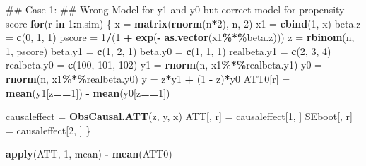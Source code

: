 \documentclass[]{article}
\newenvironment{Shaded}{\begin{snugshade}}{\end{snugshade}}
\newcommand{\KeywordTok}[1]{\textcolor[rgb]{0.13,0.29,0.53}{\textbf{#1}}}
\newcommand{\DecValTok}[1]{\textcolor[rgb]{0.00,0.00,0.81}{#1}}
\newcommand{\StringTok}[1]{\textcolor[rgb]{0.31,0.60,0.02}{#1}}
\newcommand{\ControlFlowTok}[1]{\textcolor[rgb]{0.13,0.29,0.53}{\textbf{#1}}}
\newcommand{\OperatorTok}[1]{\textcolor[rgb]{0.81,0.36,0.00}{\textbf{#1}}}
\newcommand{\NormalTok}[1]{#1}
\begin{document}
\begin{Shaded}
\begin{Highlighting}[]
\NormalTok{## Case 1:}
\NormalTok{## Wrong Model for y1 and y0 but correct model for propensity score}
\ControlFlowTok{for}\NormalTok{(r }\ControlFlowTok{in} \DecValTok{1}\OperatorTok{:}\NormalTok{n.sim)}
\NormalTok{\{}
\NormalTok{  x       =}\StringTok{ }\KeywordTok{matrix}\NormalTok{(}\KeywordTok{rnorm}\NormalTok{(n}\OperatorTok{*}\DecValTok{2}\NormalTok{), n, }\DecValTok{2}\NormalTok{)}
\NormalTok{  x1      =}\StringTok{ }\KeywordTok{cbind}\NormalTok{(}\DecValTok{1}\NormalTok{, x)}
\NormalTok{  beta.z  =}\StringTok{ }\KeywordTok{c}\NormalTok{(}\DecValTok{0}\NormalTok{, }\DecValTok{1}\NormalTok{, }\DecValTok{1}\NormalTok{)}
\NormalTok{  pscore  =}\StringTok{ }\DecValTok{1}\OperatorTok{/}\NormalTok{(}\DecValTok{1} \OperatorTok{+}\StringTok{ }\KeywordTok{exp}\NormalTok{(}\OperatorTok{-}\StringTok{ }\KeywordTok{as.vector}\NormalTok{(x1}\OperatorTok{\%*\%}\NormalTok{beta.z)))}
\NormalTok{  z       =}\StringTok{ }\KeywordTok{rbinom}\NormalTok{(n, }\DecValTok{1}\NormalTok{, pscore)}
\NormalTok{  beta.y1 =}\StringTok{ }\KeywordTok{c}\NormalTok{(}\DecValTok{1}\NormalTok{, }\DecValTok{2}\NormalTok{, }\DecValTok{1}\NormalTok{)}
\NormalTok{  beta.y0 =}\StringTok{ }\KeywordTok{c}\NormalTok{(}\DecValTok{1}\NormalTok{, }\DecValTok{1}\NormalTok{, }\DecValTok{1}\NormalTok{)}
\NormalTok{  realbeta.y1 =}\StringTok{ }\KeywordTok{c}\NormalTok{(}\DecValTok{2}\NormalTok{, }\DecValTok{3}\NormalTok{, }\DecValTok{4}\NormalTok{)}
\NormalTok{  realbeta.y0 =}\StringTok{ }\KeywordTok{c}\NormalTok{(}\DecValTok{100}\NormalTok{, }\DecValTok{101}\NormalTok{, }\DecValTok{102}\NormalTok{)}
\NormalTok{  y1      =}\StringTok{ }\KeywordTok{rnorm}\NormalTok{(n, x1}\OperatorTok{\%*\%}\NormalTok{realbeta.y1)}
\NormalTok{  y0      =}\StringTok{ }\KeywordTok{rnorm}\NormalTok{(n, x1}\OperatorTok{\%*\%}\NormalTok{realbeta.y0)}
\NormalTok{  y       =}\StringTok{ }\NormalTok{z}\OperatorTok{*}\NormalTok{y1 }\OperatorTok{+}\StringTok{ }\NormalTok{(}\DecValTok{1} \OperatorTok{-}\StringTok{ }\NormalTok{z)}\OperatorTok{*}\NormalTok{y0}
\NormalTok{  ATT0[r] =}\StringTok{ }\KeywordTok{mean}\NormalTok{(y1[z}\OperatorTok{==}\DecValTok{1}\NormalTok{]) }\OperatorTok{-}\StringTok{ }\KeywordTok{mean}\NormalTok{(y0[z}\OperatorTok{==}\DecValTok{1}\NormalTok{])}
  
\NormalTok{  causaleffect =}\StringTok{ }\KeywordTok{ObsCausal.ATT}\NormalTok{(z, y, x)}
\NormalTok{  ATT[, r]     =}\StringTok{ }\NormalTok{causaleffect[}\DecValTok{1}\NormalTok{, ]}
\NormalTok{  SEboot[, r]  =}\StringTok{ }\NormalTok{causaleffect[}\DecValTok{2}\NormalTok{, ]}
\NormalTok{\}}

\KeywordTok{apply}\NormalTok{(ATT, }\DecValTok{1}\NormalTok{, mean) }\OperatorTok{-}\StringTok{ }\KeywordTok{mean}\NormalTok{(ATT0)}
\end{Highlighting}
\end{Shaded}
\end{document}
